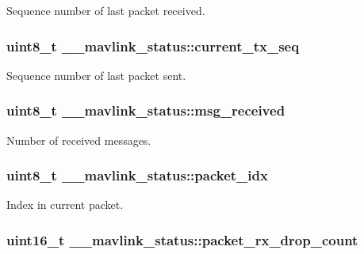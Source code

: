 Sequence number of last packet received. 

\hypertarget{struct____mavlink__status_a06482d6c3fbfa829526c9b2e2e895f32}{
\subsubsection[{current\+\_\+tx\+\_\+seq}]{\setlength{\rightskip}{0pt plus 5cm}uint8\+\_\+t \+\_\+\+\_\+mavlink\+\_\+status\+::current\+\_\+tx\+\_\+seq}}\label{struct____mavlink__status_a06482d6c3fbfa829526c9b2e2e895f32}


Sequence number of last packet sent. 

\hypertarget{struct____mavlink__status_a183576e45facc9da8123b7866d458680}{
\subsubsection[{msg\+\_\+received}]{\setlength{\rightskip}{0pt plus 5cm}uint8\+\_\+t \+\_\+\+\_\+mavlink\+\_\+status\+::msg\+\_\+received}}\label{struct____mavlink__status_a183576e45facc9da8123b7866d458680}


Number of received messages. 

\hypertarget{struct____mavlink__status_a3e582235849323267974003eb1793e25}{
\subsubsection[{packet\+\_\+idx}]{\setlength{\rightskip}{0pt plus 5cm}uint8\+\_\+t \+\_\+\+\_\+mavlink\+\_\+status\+::packet\+\_\+idx}}\label{struct____mavlink__status_a3e582235849323267974003eb1793e25}


Index in current packet. 

\hypertarget{struct____mavlink__status_a1a1f510b9484e705c971f20fd1d61912}{
\subsubsection[{packet\+\_\+rx\+\_\+drop\+\_\+count}]{\setlength{\rightskip}{0pt plus 5cm}uint16\+\_\+t \+\_\+\+\_\+mavlink\+\_\+status\+::packet\+\_\+rx\+\_\+drop\+\_\+count}}\label{struct____mavlink__status_a1a1f510b9484e705c971f20fd1d61912}


